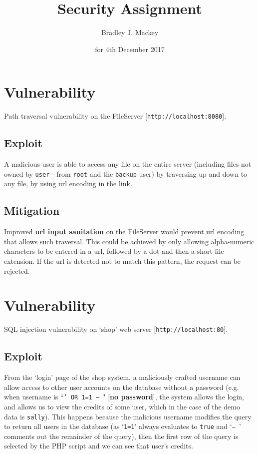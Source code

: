 \documentclass[11pt]{article}
\begin{document}
\title{\textbf{Security Assignment}}
\date{for 4th December 2017}
\author{Bradley J. Mackey}
\maketitle

\section{Vulnerability}

Path traversal vulnerability on the FileServer [\texttt{http://localhost:8080}].

\subsection{Exploit}

A malicious user is able to access any file on the entire server (including files not owned by \texttt{user} - from \texttt{root} and the \texttt{backup} user) by traversing up and down to any file, by using url encoding in the link.

\subsection{Mitigation}

Improved \textbf{url input sanitation} on the FileServer would prevent url encoding that allows such traversal. This could be achieved by only allowing alpha-numeric characters to be entered in a url, followed by a dot and then a short file extension. If the url is detected not to match this pattern, the request can be rejected.

\section{Vulnerability}

SQL injection vulnerability on `shop' web server [\texttt{http://localhost:80}].

\subsection{Exploit}

From the `login' page of the shop system, a maliciously crafted username can allow access to other user accounts on the database without a password (e.g. when username is ``\texttt{' OR 1=1 -- }" [\textbf{no password}], the system allows the login, and allows us to view the credits of some user, which in the case of the demo data is \texttt{sally}). This happens because the malicious username modifies the query to return all users in the database (as `\texttt{1=1}' always evaluates to \texttt{true} and `\texttt{-- }' comments out the remainder of the query), then the first row of the query is selected by the PHP script and we can see that user's credits.
\end{document}
